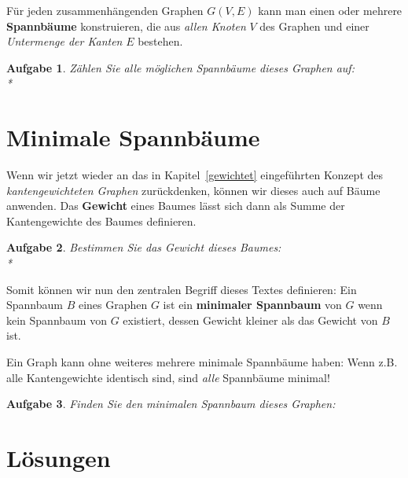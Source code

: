 \documentclass[12pt,a4paper]{report}
\theoremstyle{break}
\newtheorem{exercise}{Aufgabe}[section]
\theoremstyle{plain}
\begin{document}
F\"ur jeden zusammenh\"{a}ngenden Graphen $G(V,E)$ kann man einen oder mehrere
\textbf{Spannb\"{a}ume} konstruieren, die aus \emph{allen Knoten} $V$ des
Graphen und einer \emph{Untermenge der Kanten} $E$ bestehen.

\begin{exercise}\label{exspan}
Z\"{a}hlen Sie alle m\"{o}glichen Spannb\"{a}ume dieses Graphen auf:\\*
\end{exercise}

\section{Minimale Spannb\"{a}ume}

Wenn wir jetzt wieder an das in Kapitel~\ref{gewichtet}
eingef\"{u}hrten Konzept des \emph{kantengewichteten Graphen}
zur\"{u}ckdenken, k\"{o}nnen wir dieses auch auf B\"{a}ume
anwenden. Das \textbf{Gewicht} eines Baumes l\"{a}sst sich dann als
Summe der Kantengewichte des Baumes definieren.

\begin{exercise}\label{exgewicht}
Bestimmen Sie das Gewicht dieses Baumes:\\*
\nopagebreak{}
\end{exercise}

Somit k\"{o}nnen wir nun den zentralen Begriff dieses Textes
definieren: Ein Spannbaum $B$ eines Graphen $G$ ist ein
\textbf{minimaler Spannbaum} von $G$ wenn kein Spannbaum von $G$
existiert, dessen Gewicht kleiner als das Gewicht von $B$ ist.

Ein Graph kann ohne weiteres mehrere minimale Spannb\"{a}ume haben:
Wenn z.B. alle Kantengewichte identisch sind, sind \emph{alle}
Spannb\"{a}ume minimal!


\begin{exercise}\label{exspangewicht}
Finden Sie den minimalen Spannbaum dieses Graphen:

\end{exercise}

\section{L\"{o}sungen}
\end{document}
